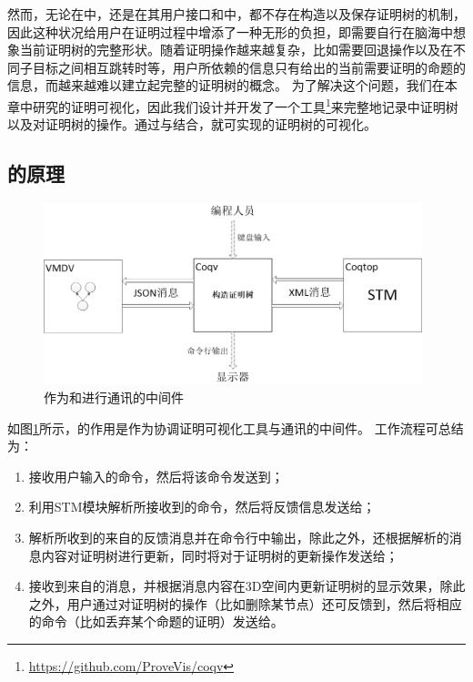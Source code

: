 然而，无论在中，还是在其用户接口和中，都不存在构造以及保存证明树的机制，因此这种状况给用户在证明过程中增添了一种无形的负担，即需要自行在脑海中想象当前证明树的完整形状。随着证明操作越来越复杂，比如需要回退操作以及在不同子目标之间相互跳转时等，用户所依赖的信息只有给出的当前需要证明的命题的信息，而越来越难以建立起完整的证明树的概念。
为了解决这个问题，我们在本章中研究的证明可视化，因此我们设计并开发了一个工具\footnote{\url{https://github.com/ProveVis/coqv}}来完整地记录中证明树以及对证明树的操作。通过与结合，就可实现的证明树的可视化。

\subsection{的原理}
\begin{figure}[h!]
	\centering
	\includegraphics[width=11cm]{Img/coqv_overview.png}
	\caption{作为和进行通讯的中间件}
	\label{coqv:overview}
\end{figure}
如图\ref{coqv:overview}所示，的作用是作为协调证明可视化工具与通讯的中间件。
工作流程可总结为：
\begin{enumerate}
	\item {}接收用户输入的命令，然后将该命令发送到；
	\item {}利用STM模块解析所接收到的命令，然后将反馈信息发送给；
	\item {}解析所收到的来自的反馈消息并在命令行中输出，除此之外，还根据解析的消息内容对证明树进行更新，同时将对于证明树的更新操作发送给；
	\item {}接收到来自的消息，并根据消息内容在3D空间内更新证明树的显示效果，除此之外，用户通过对证明树的操作（比如删除某节点）还可反馈到，然后将相应的命令（比如丢弃某个命题的证明）发送给。
\end{enumerate}

